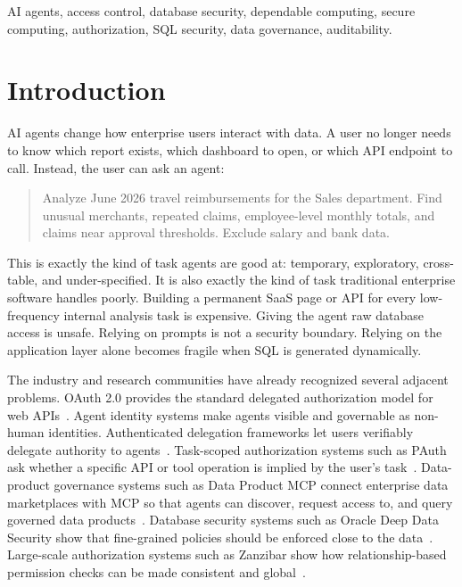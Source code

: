 \documentclass[journal]{IEEEtran}
\begin{document}
\begin{IEEEkeywords}
AI agents, access control, database security, dependable computing,
secure computing, authorization, SQL security, data governance,
auditability.
\end{IEEEkeywords}

\hypertarget{introduction}{%
\section{Introduction}\label{introduction}}

AI agents change how enterprise users interact with data. A user no
longer needs to know which report exists, which dashboard to open, or
which API endpoint to call. Instead, the user can ask an agent:

\begin{quote}
Analyze June 2026 travel reimbursements for the Sales department. Find
unusual merchants, repeated claims, employee-level monthly totals, and
claims near approval thresholds. Exclude salary and bank data.
\end{quote}

This is exactly the kind of task agents are good at: temporary,
exploratory, cross-table, and under-specified. It is also exactly the
kind of task traditional enterprise software handles poorly. Building a
permanent SaaS page or API for every low-frequency internal analysis
task is expensive. Giving the agent raw database access is unsafe.
Relying on prompts is not a security boundary. Relying on the
application layer alone becomes fragile when SQL is generated
dynamically.

The industry and research communities have already recognized several
adjacent problems. OAuth 2.0 provides the standard delegated
authorization model for web APIs~\cite{rfc6749}. Agent identity systems
make agents visible and governable as non-human identities.
Authenticated delegation frameworks let users verifiably delegate
authority to agents~\cite{south2025authenticateddelegation}.
Task-scoped authorization systems such as PAuth ask whether a specific
API or tool operation is implied by the user's
task~\cite{sharma2026pauth}. Data-product governance systems such as
Data Product MCP connect enterprise data marketplaces with MCP so that
agents can discover, request access to, and query governed data
products~\cite{tonnarelli2026dataproductmcp,mcp2025specification}.
Database security systems such as Oracle Deep Data Security show that
fine-grained policies should be enforced close to the
data~\cite{oracle2026deepdatasecuritydocs,oracle2026deepdatasecuritybrief}.
Large-scale authorization systems such as Zanzibar show how
relationship-based permission checks can be made consistent and
global~\cite{pang2019zanzibar}.
\end{document}
